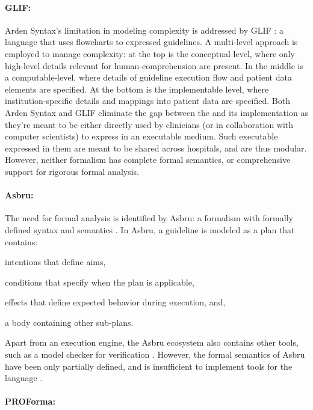 \paragraph{GLIF:}

Arden Syntax's limitation in modeling complexity is addressed by
GLIF \cite{BoxwalaJBI04}: a language that uses flowcharts to expressed
guidelines. A multi-level approach is
employed to manage complexity: at the top is the conceptual level, where
only high-level details relevant for human-comprehension are present. In the
middle is a computable-level, where details of guideline execution flow
and patient data elements are specified. At the bottom is the implementable
level, where institution-specific details and mappings into patient data are
specified. Both Arden Syntax and GLIF  eliminate
the gap between the \BPG{} and its implementation as
they're meant to be either directly used by clinicians (or in collaboration with
computer scientists) to express \BPGs{} in an executable medium. Such executable
\BPGs{} expressed in them are meant to be shared across hospitals, and are thus modular.
However, neither formalism has complete formal semantics, or comprehensive support for
rigorous formal analysis.

\paragraph{Asbru:}

The need for formal analysis is identified by Asbru: a formalism with formally
defined syntax and semantics \cite{ShaharAMIA96}. In Asbru, a guideline is modeled as a plan
that contains:
\begin{enumerate*}[label=(\roman*)]
  \item intentions that define aims,
  \item conditions that specify when the plan is applicable,
  \item effects that define expected behavior during execution, and,
  \item a body containing other sub-plans.
\end{enumerate*}
Apart from an execution engine, the Asbru ecosystem also contains
other tools, such as a model checker for verification \cite{BaumlerSPIN06}.
However, the formal semantics of Asbru have been only partially defined, and
is insufficient to implement tools for the language \cite{SuttonAMIA03}.

\paragraph{PROForma:}

